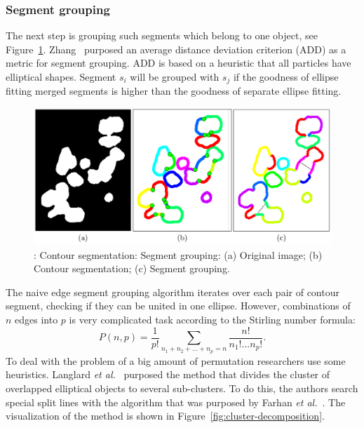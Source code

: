\documentclass{lutmscthesis}[2010/09/22]
\begin{document}
\subsubsection{Segment grouping}
The next step is grouping such segments which belong to one object, see Figure~\ref{fig:Segment-grouping}. Zhang~\cite{bubble} purposed an average distance deviation criterion (ADD) as a metric for segment grouping. ADD is based on a heuristic that all particles have elliptical shapes. Segment $s_i$ will be grouped with $s_j$ if the goodness of ellipse fitting merged segments is higher than the goodness of separate ellipse fitting.

\begin{figure} [ht]
  \includegraphics[width=\linewidth, scale=0.5]{segment-grouping.png}
  \caption{: Contour segmentation: 
    Segment grouping: 
    (a) Original image; 
    (b) Contour segmentation;
    (c) Segment grouping.~\cite{Zafari15}}
  \label{fig:Segment-grouping}
\end{figure}

The naive edge segment grouping algorithm iterates over each pair of contour segment, checking if they can be united in one ellipse. However, combinations of $n$ edges into $p$ is very complicated task according to the Stirling number formula:
    \begin{equation}
        P(n,p) = \frac{1}{p!}\sum_{n_1+n_2+...+n_p=n}\frac{n!}{n_1!...n_p!}.
    \end{equation}
To deal with the problem of a big amount of permutation researchers use some heuristics. Langlard \emph{et al.}~\cite{LANGLARD2018} purposed the method that divides the cluster of overlapped elliptical objects to several sub-clusters. To do this, the authors search special split lines with the algorithm that was purposed by Farhan \emph{et al.}~\cite{farhan}. The visualization of the method is shown in Figure~\ref{fig:cluster-decomposition}.
\end{document}
